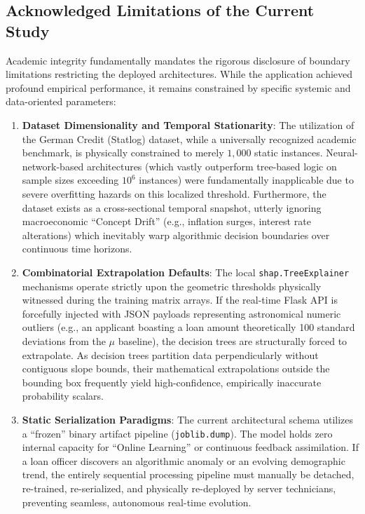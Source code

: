 \hypertarget{acknowledged-limitations-of-the-current-study}{%
\subsection{Acknowledged Limitations of the Current
Study}\label{acknowledged-limitations-of-the-current-study}}

Academic integrity fundamentally mandates the rigorous disclosure of
boundary limitations restricting the deployed architectures. While the
application achieved profound empirical performance, it remains
constrained by specific systemic and data-oriented parameters:

\begin{enumerate}
\def\labelenumi{\arabic{enumi}.}
\tightlist
\item
  \textbf{Dataset Dimensionality and Temporal Stationarity}: The
  utilization of the German Credit (Statlog) dataset, while a
  universally recognized academic benchmark, is physically constrained
  to merely \(1,000\) static instances. Neural-network-based
  architectures (which vastly outperform tree-based logic on sample
  sizes exceeding \(10^6\) instances) were fundamentally inapplicable
  due to severe overfitting hazards on this localized threshold.
  Furthermore, the dataset exists as a cross-sectional temporal
  snapshot, utterly ignoring macroeconomic ``Concept Drift'' (e.g.,
  inflation surges, interest rate alterations) which inevitably warp
  algorithmic decision boundaries over continuous time horizons.
\item
  \textbf{Combinatorial Extrapolation Defaults}: The local
  \texttt{shap.TreeExplainer} mechanisms operate strictly upon the
  geometric thresholds physically witnessed during the training matrix
  arrays. If the real-time Flask API is forcefully injected with JSON
  payloads representing astronomical numeric outliers (e.g., an
  applicant boasting a loan amount theoretically 100 standard deviations
  from the \(\mu\) baseline), the decision trees are structurally forced
  to extrapolate. As decision trees partition data perpendicularly
  without contiguous slope bounds, their mathematical extrapolations
  outside the bounding box frequently yield high-confidence, empirically
  inaccurate probability scalars.
\item
  \textbf{Static Serialization Paradigms}: The current architectural
  schema utilizes a ``frozen'' binary artifact pipeline
  (\texttt{joblib.dump}). The model holds zero internal capacity for
  ``Online Learning'' or continuous feedback assimilation. If a loan
  officer discovers an algorithmic anomaly or an evolving demographic
  trend, the entirely sequential processing pipeline must manually be
  detached, re-trained, re-serialized, and physically re-deployed by
  server technicians, preventing seamless, autonomous real-time
  evolution.
\end{enumerate}

